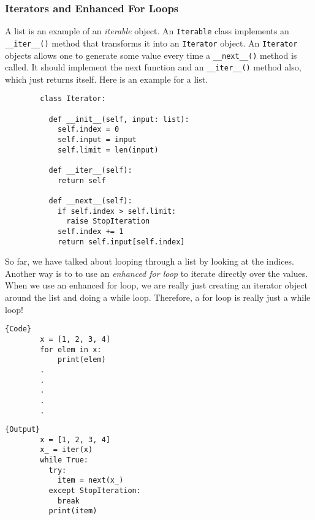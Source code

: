 \documentclass{article}
\begin{document}
    \subsubsection{Iterators and Enhanced For Loops}

      A list is an example of an \textit{iterable} object. An \texttt{Iterable} class implements an \texttt{\_\_iter\_\_()} method that transforms it into an \texttt{Iterator} object. An \texttt{Iterator} objects allows one to generate some value every time a \texttt{\_\_next\_\_()} method is called. It should implement the next function and an \texttt{\_\_iter\_\_()} method also, which just returns itself. Here is an example for a list. 

      \begin{lstlisting}
        class Iterator: 

          def __init__(self, input: list): 
            self.index = 0 
            self.input = input
            self.limit = len(input)

          def __iter__(self): 
            return self

          def __next__(self): 
            if self.index > self.limit: 
              raise StopIteration
            self.index += 1 
            return self.input[self.index]
      \end{lstlisting}

      So far, we have talked about looping through a list by looking at the indices. Another way is to to use an \textit{enhanced for loop} to iterate directly over the values. When we use an enhanced for loop, we are really just creating an iterator object around the list and doing a while loop. Therefore, a for loop is really just a while loop!  

      \noindent\begin{minipage}{.5\textwidth}
      \begin{lstlisting}[]{Code}
        x = [1, 2, 3, 4] 
        for elem in x: 
            print(elem)
        .
        .
        .
        .
        .
      \end{lstlisting}
      \end{minipage}
      \hfill
      \begin{minipage}{.49\textwidth}
      \begin{lstlisting}[]{Output}
        x = [1, 2, 3, 4] 
        x_ = iter(x) 
        while True: 
          try: 
            item = next(x_)
          except StopIteration: 
            break 
          print(item)
      \end{lstlisting}
      \end{minipage}
\end{document}
